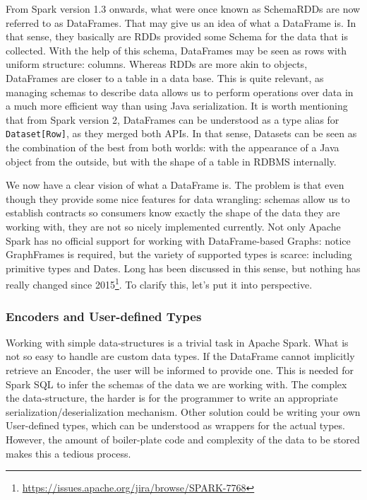 From Spark version 1.3 onwards, what were once known as SchemaRDDs are now referred to as DataFrames. That may give us an idea of what a DataFrame is. In that sense, they basically are RDDs provided some Schema for the data that is collected. With the help of this schema, DataFrames may be seen as rows with uniform structure: columns. Whereas RDDs are more akin to objects, DataFrames are closer to a table in a data base. This is quite relevant, as managing schemas to describe data allows us to perform operations over data in a much more efficient way than using Java serialization. It is worth mentioning that from Spark version 2, DataFrames can be understood as a type alias for \texttt{Dataset[Row]}, as they merged both APIs. In that sense, Datasets can be seen as the combination of the best from both worlds: with the appearance of a Java object from the outside, but with the shape of a table in RDBMS internally.

We now have a clear vision of what a DataFrame is. The problem is that even though they provide some nice features for data wrangling: schemas allow us to establish contracts so consumers know exactly the shape of the data they are working with, they are not so nicely implemented currently. Not only Apache Spark has no official support for working with DataFrame-based Graphs: notice GraphFrames is required, but the variety of supported types is scarce: including primitive types and Dates. Long has been discussed in this sense, but nothing has really changed since 2015\footnote{\url{https://issues.apache.org/jira/browse/SPARK-7768}}. To clarify this, let's put it into perspective.

\subsubsection{Encoders and User-defined Types}

Working with simple data-structures is a trivial task in Apache Spark. What is not so easy to handle are custom data types. If the DataFrame cannot implicitly retrieve an Encoder, the user will be informed to provide one. This is needed for Spark SQL to infer the schemas of the data we are working with. The complex the data-structure, the harder is for the programmer to write an appropriate serialization/deserialization mechanism. Other solution could be writing your own User-defined types, which can be understood as wrappers for the actual types. However, the amount of boiler-plate code and complexity of the data to be stored makes this a tedious process.